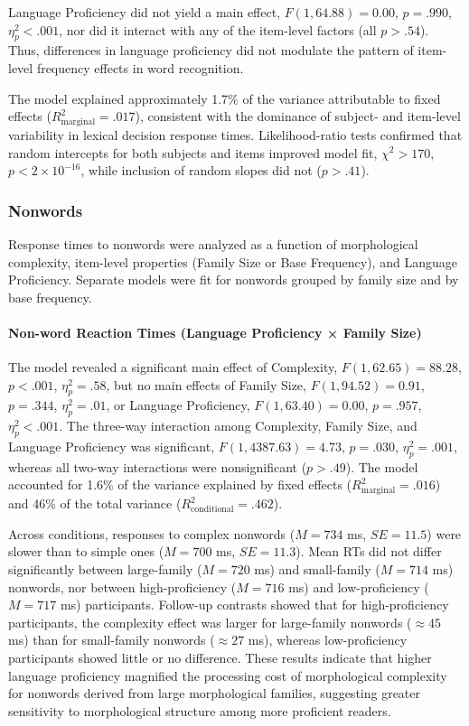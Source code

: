 \documentclass[preprint,12pt, authoryear, review]{elsarticle}
\begin{document}
	Language Proficiency did not yield a main effect, $F(1, 64.88) = 0.00$, $p = .990$, $\eta_p^2 < .001$, nor did it interact with any of the item-level factors (all $p > .54$). Thus, differences in language proficiency did not modulate the pattern of item-level frequency effects in word recognition. 
	
	The model explained approximately 1.7\% of the variance attributable to fixed effects ($R^2_{\text{marginal}} = .017$), consistent with the dominance of subject- and item-level variability in lexical decision response times. Likelihood-ratio tests confirmed that random intercepts for both subjects and items improved model fit, $\chi^2 > 170$, $p < 2 \times 10^{-16}$, while inclusion of random slopes did not ($p > .41$).
	
	\subsubsection{Nonwords}
	
	Response times to nonwords were analyzed as a function of morphological complexity, item-level properties (Family Size or Base Frequency), and Language Proficiency. Separate models were fit for nonwords grouped by family size and by base frequency.
	
	\paragraph{Non-word Reaction Times (Language Proficiency × Family Size)}
	
	The model revealed a significant main effect of Complexity, $F(1, 62.65) = 88.28$, $p < .001$, $\eta_p^2 = .58$, but no main effects of Family Size, $F(1, 94.52) = 0.91$, $p = .344$, $\eta_p^2 = .01$, or Language Proficiency, $F(1, 63.40) = 0.00$, $p = .957$, $\eta_p^2 < .001$. The three-way interaction among Complexity, Family Size, and Language Proficiency was significant, $F(1, 4387.63) = 4.73$, $p = .030$, $\eta_p^2 = .001$, whereas all two-way interactions were nonsignificant ($p > .49$). The model accounted for 1.6\% of the variance explained by fixed effects ($R^2_{\text{marginal}} = .016$) and 46\% of the total variance ($R^2_{\text{conditional}} = .462$). 
	
	Across conditions, responses to complex nonwords ($M = 734$ ms, $SE = 11.5$) were slower than to simple ones ($M = 700$ ms, $SE = 11.3$). Mean RTs did not differ significantly between large-family ($M = 720$ ms) and small-family ($M = 714$ ms) nonwords, nor between high-proficiency ($M = 716$ ms) and low-proficiency ($M = 717$ ms) participants. Follow-up contrasts showed that for high-proficiency participants, the complexity effect was larger for large-family nonwords ($\approx 45$ ms) than for small-family nonwords ($\approx 27$ ms), whereas low-proficiency participants showed little or no difference. These results indicate that higher language proficiency magnified the processing cost of morphological complexity for nonwords derived from large morphological families, suggesting greater sensitivity to morphological structure among more proficient readers.
	
\end{document}

